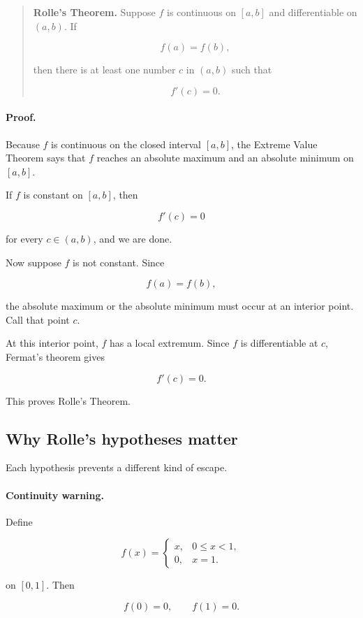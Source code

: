 \begin{quote}
\textbf{Rolle's Theorem.}
Suppose \(f\) is continuous on \([a,b]\) and differentiable on \((a,b)\).  If

\[
f(a)=f(b),
\]

then there is at least one number \(c\) in \((a,b)\) such that

\[
\boxed{f'(c)=0.}
\]
\end{quote}

\paragraph{Proof.}
Because \(f\) is continuous on the closed interval \([a,b]\), the Extreme Value
Theorem says that \(f\) reaches an absolute maximum and an absolute minimum on
\([a,b]\).

If \(f\) is constant on \([a,b]\), then

\[
f'(c)=0
\]

for every \(c\in(a,b)\), and we are done.

Now suppose \(f\) is not constant.  Since

\[
f(a)=f(b),
\]

the absolute maximum or the absolute minimum must occur at an interior point.  Call
that point \(c\).

At this interior point, \(f\) has a local extremum.  Since \(f\) is differentiable at
\(c\), Fermat's theorem gives

\[
f'(c)=0.
\]

This proves Rolle's Theorem.

\subsection{Why Rolle's hypotheses matter}
\label{subsec:rolle-hypotheses-matter}

Each hypothesis prevents a different kind of escape.

\paragraph{Continuity warning.}
Define

\[
f(x)=
\begin{cases}
x, & 0\le x<1,\\
0, & x=1.
\end{cases}
\]

on \([0,1]\).  Then

\[
f(0)=0,
\qquad
f(1)=0.
\]

